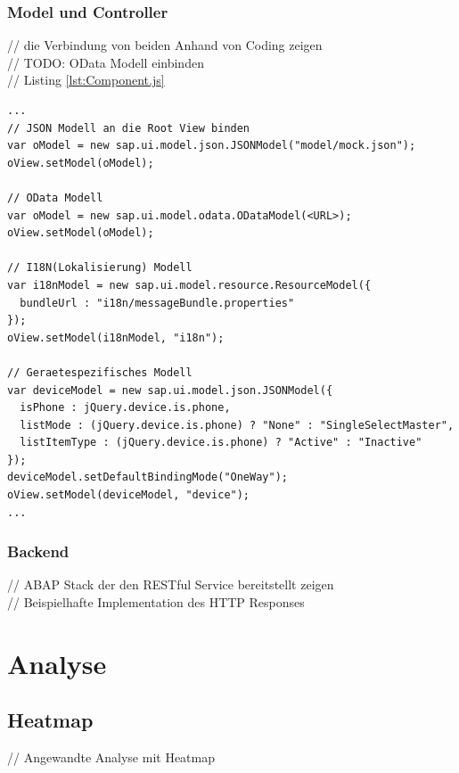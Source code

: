 \documentclass[12pt,a4paper,bibliography=totocnumbered,listof=totocnumbered]{scrartcl}
\begin{document}
\subsubsection{Model und Controller}
// die Verbindung von beiden Anhand von Coding zeigen\\
// TODO: OData Modell einbinden\\
// Listing \ref{lst:Component.js}
	\vspace{1em}
	\begin{lstlisting}[caption=Component.js - Datenmodell an die Root View binden, label=lst:Component.js]
...
// JSON Modell an die Root View binden
var oModel = new sap.ui.model.json.JSONModel("model/mock.json");
oView.setModel(oModel);

// OData Modell
var oModel = new sap.ui.model.odata.ODataModel(<URL>);
oView.setModel(oModel);

// I18N(Lokalisierung) Modell
var i18nModel = new sap.ui.model.resource.ResourceModel({
  bundleUrl : "i18n/messageBundle.properties"
});
oView.setModel(i18nModel, "i18n");

// Geraetespezifisches Modell
var deviceModel = new sap.ui.model.json.JSONModel({
  isPhone : jQuery.device.is.phone,
  listMode : (jQuery.device.is.phone) ? "None" : "SingleSelectMaster",
  listItemType : (jQuery.device.is.phone) ? "Active" : "Inactive"
});
deviceModel.setDefaultBindingMode("OneWay");
oView.setModel(deviceModel, "device");
...
	\end{lstlisting}

\subsubsection{Backend}
// ABAP Stack der den RESTful Service bereitstellt zeigen\\
// Beispielhafte Implementation des HTTP Responses\\
\pagebreak

\section{Analyse}
\subsection{Heatmap}
// Angewandte Analyse mit Heatmap\\
\end{document}

